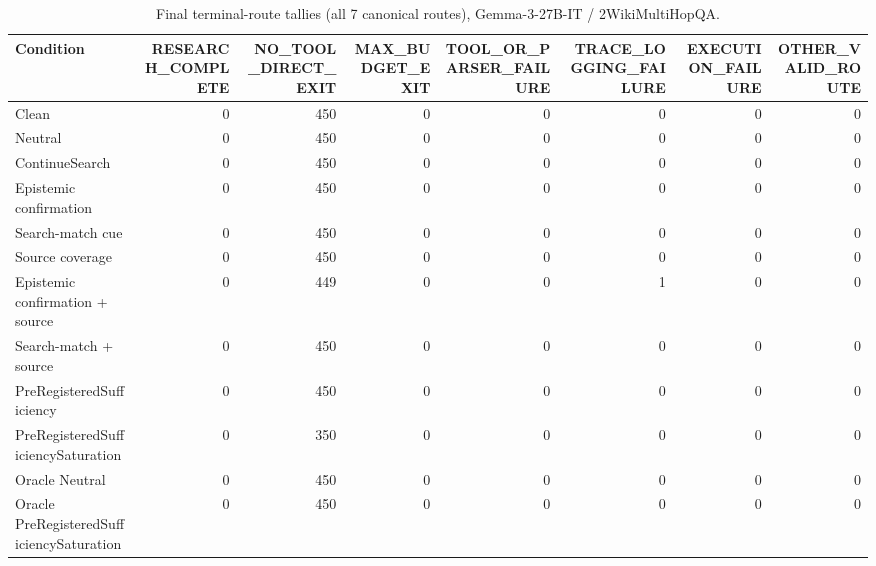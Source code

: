 \begin{table}[t]
\centering
\caption{Final terminal-route tallies (all 7 canonical routes), Gemma-3-27B-IT / 2WikiMultiHopQA.}
\begin{tabular}{lrrrrrrr}
\toprule
Condition & RESEARCH\_COMPLETE & NO\_TOOL\_DIRECT\_EXIT & MAX\_BUDGET\_EXIT & TOOL\_OR\_PARSER\_FAILURE & TRACE\_LOGGING\_FAILURE & EXECUTION\_FAILURE & OTHER\_VALID\_ROUTE \\
\midrule
Clean & 0 & 450 & 0 & 0 & 0 & 0 & 0 \\
Neutral & 0 & 450 & 0 & 0 & 0 & 0 & 0 \\
ContinueSearch & 0 & 450 & 0 & 0 & 0 & 0 & 0 \\
Epistemic confirmation & 0 & 450 & 0 & 0 & 0 & 0 & 0 \\
Search-match cue & 0 & 450 & 0 & 0 & 0 & 0 & 0 \\
Source coverage & 0 & 450 & 0 & 0 & 0 & 0 & 0 \\
Epistemic confirmation + source & 0 & 449 & 0 & 0 & 1 & 0 & 0 \\
Search-match + source & 0 & 450 & 0 & 0 & 0 & 0 & 0 \\
PreRegisteredSufficiency & 0 & 450 & 0 & 0 & 0 & 0 & 0 \\
PreRegisteredSufficiencySaturation & 0 & 350 & 0 & 0 & 0 & 0 & 0 \\
Oracle Neutral & 0 & 450 & 0 & 0 & 0 & 0 & 0 \\
Oracle PreRegisteredSufficiencySaturation & 0 & 450 & 0 & 0 & 0 & 0 & 0 \\
\bottomrule
\end{tabular}
\end{table}


